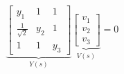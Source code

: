 \documentclass{book}
\begin{document}
\setcounter{chapter}{3}

\begin{gather}
\underbrace{\begin{bmatrix}
y_{1} & 1 & 1 \\[4pt]
\frac{1}{\sqrt{2}} & y_{2} & 1 \\[4pt]
1 & 1 & y_{3}
\end{bmatrix}}_{Y(s)}
\underbrace{\begin{bmatrix}
v_{1} \\[4pt] v_{2} \\[4pt] v_{3}
\end{bmatrix}}_{V(s)}=0
\end{gather}
\end{document}
